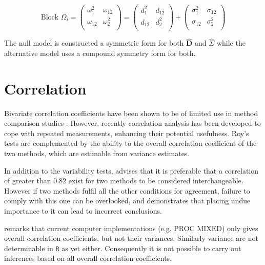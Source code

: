 \documentclass[12pt, a4paper]{report}
\theoremstyle{plain}
\theoremstyle{definition}
\theoremstyle{remark}
\begin{document}
\begin{equation}\mbox{Block } {\Omega}_i = \left(\begin{array}{cc}
\omega^2_1  & \omega_{12} \\
\omega_{12} & \omega^2_2 \\
\end{array}  \right)
=  \left(
\begin{array}{cc}
d^2_1  & d_{12} \\
d_{12} & d^2_2 \\
\end{array} \right)+
\left(
\begin{array}{cc}
\sigma^2_1  & \sigma_{12} \\
\sigma_{12} & \sigma^2_2 \\
\end{array}\right)
\end{equation}


The null model is constructed a symmetric form for both $\boldsymbol{\hat{D}}$ and ${\hat{\Sigma}}$ while the alternative model uses a compound symmetry form for both.


\section{Correlation}
Bivariate correlation coefficients have been shown to be of limited use in method comparison studies \citep{BA86}. However,
recently correlation analysis has been developed to cope with repeated measurements, enhancing their potential usefulness.
Roy's tests are complemented by the ability to the overall correlation coefficient of the two methods, which are estimable from variance estimates.


In addition to the variability tests, \citet{ARoy2009} advises that it is preferable that a correlation of greater than $0.82$ exist for two methods to be considered interchangeable. However if two methods fulfil all the other conditions for agreement, failure to comply with this one can be overlooked, and demonstrates that placing undue importance to it can lead to incorrect conclusions.

\citet{ARoy2009} remarks that current computer implementations (e.g. PROC MIXED) only gives overall correlation coefficients, but not their variances. Similarly variance are not determinable in \texttt{R} as yet either. Consequently it is not possible to carry out inferences based on all overall correlation coefficients.
\end{document}
